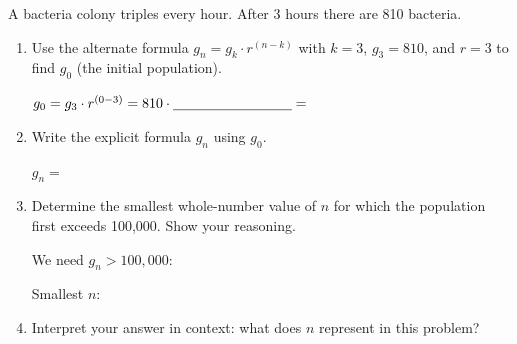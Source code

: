 \documentclass[10pt]{article}
\begin{document}
\vspace{0.08in}

\begin{tcolorbox}[colback=white, colframe=black!40,
    title=\textbf{Tier E --- Extend},
    fonttitle=\bfseries, arc=2mm, left=3mm, right=3mm, top=2mm, bottom=2mm]

A bacteria colony triples every hour. After 3 hours there are 810 bacteria.

\begin{enumerate}[itemsep=12pt]

  \item Use the alternate formula $g_n = g_k \cdot r^{(n-k)}$ with $k = 3$, $g_3 = 810$,
        and $r = 3$ to find $g_0$ (the initial population).

        \vspace{0.04in}
        $g_0 = g_3 \cdot r^{(0-3)} = 810 \cdot \blank{3cm} = $ \blank{3cm}

  \item Write the explicit formula $g_n$ using $g_0$.

        \vspace{0.04in}
        $g_n = $ \blank{5cm}

  \item Determine the smallest whole-number value of $n$ for which the population first
        exceeds 100{,}000. Show your reasoning.

        \vspace{0.04in}
        We need $g_n > 100{,}000$: \blank{8cm}

        \vspace{0.04in}
        Smallest $n$: \blank{2cm}

  \item Interpret your answer in context: what does $n$ represent in this problem?

        \vspace{0.04in}

\end{enumerate}
\end{tcolorbox}
\end{document}
